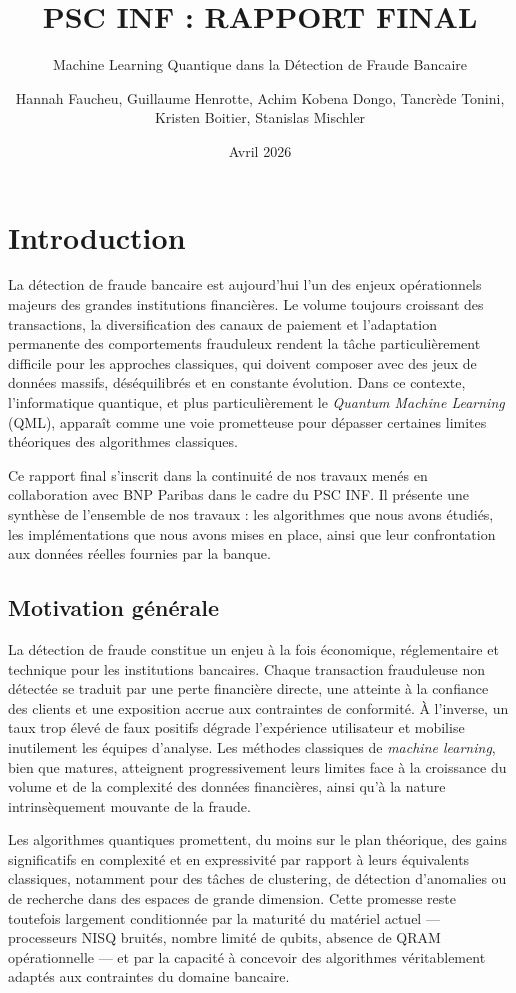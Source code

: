 \documentclass[a4paper]{article}
\author{Hannah Faucheu, Guillaume Henrotte, Achim Kobena Dongo, Tancrède Tonini, Kristen Boitier, Stanislas Mischler}
\date{Avril 2026}
\title{PSC INF : RAPPORT FINAL}
\subtitle{Machine Learning Quantique dans la Détection de Fraude Bancaire}
\begin{document}
\maketitle
\tableofcontents

\section{Introduction}

La détection de fraude bancaire est aujourd'hui l'un des enjeux opérationnels majeurs des grandes institutions financières. Le volume toujours croissant des transactions, la diversification des canaux de paiement et l'adaptation permanente des comportements frauduleux rendent la tâche particulièrement difficile pour les approches classiques, qui doivent composer avec des jeux de données massifs, déséquilibrés et en constante évolution. Dans ce contexte, l'informatique quantique, et plus particulièrement le \textit{Quantum Machine Learning} (QML), apparaît comme une voie prometteuse pour dépasser certaines limites théoriques des algorithmes classiques.

Ce rapport final s'inscrit dans la continuité de nos travaux menés en collaboration avec BNP Paribas dans le cadre du PSC INF. Il présente une synthèse de l'ensemble de nos travaux : les algorithmes que nous avons étudiés, les implémentations que nous avons mises en place, ainsi que leur confrontation aux données réelles fournies par la banque.

\subsection{Motivation générale}

La détection de fraude constitue un enjeu à la fois économique, réglementaire et technique pour les institutions bancaires. Chaque transaction frauduleuse non détectée se traduit par une perte financière directe, une atteinte à la confiance des clients et une exposition accrue aux contraintes de conformité. À l'inverse, un taux trop élevé de faux positifs dégrade l'expérience utilisateur et mobilise inutilement les équipes d'analyse. Les méthodes classiques de \textit{machine learning}, bien que matures, atteignent progressivement leurs limites face à la croissance du volume et de la complexité des données financières, ainsi qu'à la nature intrinsèquement mouvante de la fraude.

Les algorithmes quantiques promettent, du moins sur le plan théorique, des gains significatifs en complexité et en expressivité par rapport à leurs équivalents classiques, notamment pour des tâches de clustering, de détection d'anomalies ou de recherche dans des espaces de grande dimension. Cette promesse reste toutefois largement conditionnée par la maturité du matériel actuel — processeurs NISQ bruités, nombre limité de qubits, absence de QRAM opérationnelle — et par la capacité à concevoir des algorithmes véritablement adaptés aux contraintes du domaine bancaire.
\end{document}
